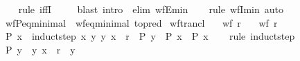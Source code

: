 \begin{isabellebody}
%
\isadelimproof
\ \ %
\endisadelimproof
%
\isatagproof
{}\isamarkupfalse%
\ {\isacharparenleft}{\kern0pt}rule\ iffI{\isacharparenright}{\kern0pt}\isanewline
\ \ \ \isamarkupfalse%
\ {\isacharparenleft}{\kern0pt}blast\ intro{\isacharcolon}{\kern0pt}\ \ elim{\isacharbang}{\kern0pt}{\isacharcolon}{\kern0pt}\ wfE{\isacharunderscore}{\kern0pt}min{\isacharparenright}{\kern0pt}\isanewline
\ \ \isamarkupfalse%
\ {\isacharparenleft}{\kern0pt}rule\ wfI{\isacharunderscore}{\kern0pt}min{\isacharparenright}{\kern0pt}\ auto%
\endisatagproof
{\isafoldproof}%
%
\isadelimproof
\isanewline
%
\endisadelimproof
\isanewline
{}\isamarkupfalse%
\ wfP{\isacharunderscore}{\kern0pt}eq{\isacharunderscore}{\kern0pt}minimal\ {\isacharequal}{\kern0pt}\ wf{\isacharunderscore}{\kern0pt}eq{\isacharunderscore}{\kern0pt}minimal\ {\isacharbrackleft}{\kern0pt}to{\isacharunderscore}{\kern0pt}pred{\isacharbrackright}{\kern0pt}%
\isadelimdocument
%
\endisadelimdocument
%
\isatagdocument
%
\isamarkuptrue%
%
\endisatagdocument
{\isafolddocument}%
%
\isadelimdocument
%
\endisadelimdocument
{}\isamarkupfalse%
\ wf{\isacharunderscore}{\kern0pt}trancl{\isacharcolon}{\kern0pt}\isanewline
\ \ \ {\isachardoublequoteopen}wf\ r{\isachardoublequoteclose}\isanewline
\ \ \ {\isachardoublequoteopen}wf\ {\isacharparenleft}{\kern0pt}r\isactrlsup {\isacharplus}{\kern0pt}{\isacharparenright}{\kern0pt}{\isachardoublequoteclose}\isanewline
%
\isadelimproof
%
\endisadelimproof
%
\isatagproof
{}\isamarkupfalse%
\ {\isacharminus}{\kern0pt}\isanewline
\ \ \isamarkupfalse%
\ {\isachardoublequoteopen}P\ x{\isachardoublequoteclose}\ \ induct{\isacharunderscore}{\kern0pt}step{\isacharcolon}{\kern0pt}\ {\isachardoublequoteopen}{\isasymAnd}x{\isachardot}{\kern0pt}\ {\isacharparenleft}{\kern0pt}{\isasymAnd}y{\isachardot}{\kern0pt}\ {\isacharparenleft}{\kern0pt}y{\isacharcomma}{\kern0pt}\ x{\isacharparenright}{\kern0pt}\ {\isasymin}\ r\isactrlsup {\isacharplus}{\kern0pt}\ {\isasymLongrightarrow}\ P\ y{\isacharparenright}{\kern0pt}\ {\isasymLongrightarrow}\ P\ x{\isachardoublequoteclose}\ \ P\ x\isanewline
\ \ \isamarkupfalse%
\ {\isacharparenleft}{\kern0pt}rule\ induct{\isacharunderscore}{\kern0pt}step{\isacharparenright}{\kern0pt}\isanewline
\ \ \ \ \isamarkupfalse%
\ {\isachardoublequoteopen}P\ y{\isachardoublequoteclose}\ \ {\isachardoublequoteopen}{\isacharparenleft}{\kern0pt}y{\isacharcomma}{\kern0pt}\ x{\isacharparenright}{\kern0pt}\ {\isasymin}\ r\isactrlsup {\isacharplus}{\kern0pt}{\isachardoublequoteclose}\ \ y\isanewline

\end{isabellebody}
